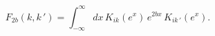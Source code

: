 \begin{equation}\label{I(k,k)}
F_{2b}(k,k\,')=
\int_{-\infty}^{\infty}dx\, K_{ik}(e^x)\,e^{{2b} x}\,K_{ik\,'}(e^x).
\end{equation}

